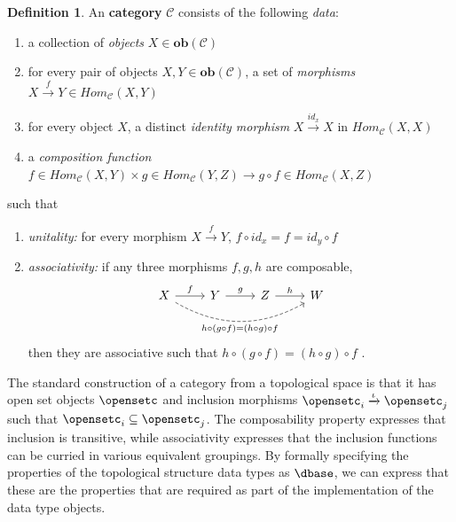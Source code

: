 \documentclass[journal]{IEEEtran}
\theoremstyle{definition}
\newtheorem{definition}{Definition}[section]
\theoremstyle{remark}
\begin{document}
\begin{definition}\label{def:atct:category}
   An \textbf{category} $\mathcal{C}$ consists of the following \textit{data}:
\begin{enumerate}
  \item a collection of \textit{objects} $X \in \textbf{ob}(\mathcal{C})$
  \item for every pair of objects $X, Y \in \textbf{ob}(\mathcal{C})$, a set of \textit{morphisms} $X \xrightarrow{f} Y \in Hom_{\mathcal{C}}(X, Y)$
  \item for every object $X$, a distinct \textit{identity morphism} $X \xrightarrow {id_x} X$ in $Hom_{\mathcal{C}}(X, X)$
  \item a \textit{composition function} $f \in Hom_{\mathcal{C}}(X, Y) \times  g \in Hom_{\mathcal{C}}(Y, Z) \rightarrow g \circ f \in Hom_{\mathcal{C}}(X, Z)$
\end{enumerate}
such that
\begin{enumerate}
  \item \textit{unitality:} for every morphism $ X \xrightarrow{f} Y$, $f \circ id_x = f = id_y \circ f$
  \item \textit{associativity:} if any three morphisms $f, g, h$ are composable,
    \begin{equation*}
      \begin{tikzcd}
        X \arrow[r, "f"] \arrow[rrr, "h\circ(g\circ f) = (h\circ g)\circ f"', bend right, dashed] & Y  \arrow[r, "g"] & Z \arrow[r, "h"] & W
        \end{tikzcd}
  \end{equation*}
  then they are associative such that $h\circ(g\circ f) = (h \circ g) \circ f$  \cite{lawvere2009conceptual,riehlCategoryTheoryContext,maclaneCategoriesWorkingMathematician2013,fongInvitationAppliedCategory2019}.
  \end{enumerate}
\end{definition}

The standard construction of a category from a topological space is that it has open set objects $\opensetc$ and inclusion morphisms $\opensetc_i \xrightarrow{\iota} \opensetc_j$ such that $\opensetc_i \subseteq \opensetc_j$\cite{riehlCategoryTheoryContext}. The composability property expresses that inclusion is transitive, while associativity expresses that the inclusion functions can be curried in various equivalent groupings. By formally specifying the properties of the topological structure data types as $\mathcal{\dbase}$, we can express that these are the properties that are required as part of the implementation of the data type objects.
\end{document}
